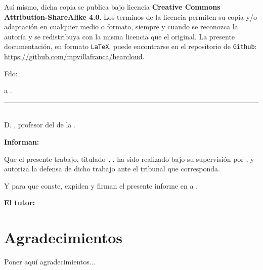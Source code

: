 \bigskip
Así mismo, dicha copia se publica bajo licencia \textbf{Creative Commons Attribution-ShareAlike 4.0}. Los terminos de la licencia permiten su copia y/o adaptación en cualquier medio o formato, siempre y cuando se reconozca la autoría y se redistribuya con la misma licencia que el original. La presente documentación, en formato {\tt LaTeX}, puede encontrarse en el repositorio de {\tt Github}: \url{https://github.com/mpvillafranca/hearcloud}.

\vspace{6cm}

\noindent Fdo: \myName

\vspace{2cm}

\begin{flushright}
\myLocation a \myTime.
\end{flushright}

\newpage


\thispagestyle{empty}
\noindent\rule[-1ex]{\textwidth}{2pt}\\[4.5ex]

D. \textbf{\myProf}, profesor del \myDepartment de la \myUni.

\vspace{0.5cm}

\textbf{Informan:}

\vspace{0.5cm}

Que el presente trabajo, titulado \textit{\textbf{\myTitle, \mySubTitle}}, ha sido realizado bajo su supervisión por \textbf{\myName}, y autoriza la defensa de dicho trabajo ante el tribunal que corresponda.

\vspace{0.5cm}

Y para que conste, expiden y firman el presente informe en \myLocation a \myTime.

\vspace{1cm}

\textbf{El tutor:}

\vspace{5cm}

\noindent \textbf{\myProf}

\chapter*{Agradecimientos}
\thispagestyle{empty}

       \vspace{1cm}


Poner aquí agradecimientos...

